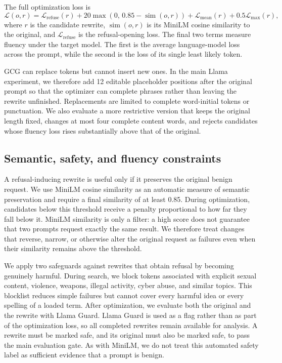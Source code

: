 \documentclass{article}
\begin{document}
The full optimization loss is
\[
\mathcal{L}(o,r)
=
\mathcal{L}_{\mathrm{refuse}}(r)
+
20\max\!\left(0,\,0.85-\operatorname{sim}(o,r)\right)
+
\mathcal{L}_{\mathrm{mean}}(r)
+
0.5\mathcal{L}_{\mathrm{max}}(r),
\]
where \(r\) is the candidate rewrite, \(\operatorname{sim}(o,r)\) is its MiniLM cosine similarity to the original, and \(\mathcal{L}_{\mathrm{refuse}}\) is the refusal-opening loss. The final two terms measure fluency under the target model. The first is the average language-model loss across the prompt, while the second is the loss of its single least likely token.

GCG can replace tokens but cannot insert new ones. In the main Llama experiment, we therefore add 12 editable placeholder positions after the original prompt so that the optimizer can complete phrases rather than leaving the rewrite unfinished. Replacements are limited to complete word-initial tokens or punctuation. We also evaluate a more restrictive version that keeps the original length fixed, changes at most four complete content words, and rejects candidates whose fluency loss rises substantially above that of the original.

\subsection{Semantic, safety, and fluency constraints}

A refusal-inducing rewrite is useful only if it preserves the original benign request. We use MiniLM cosine similarity as an automatic measure of semantic preservation and require a final similarity of at least 0.85. During optimization, candidates below this threshold receive a penalty proportional to how far they fall below it. MiniLM similarity is only a filter: a high score does not guarantee that two prompts request exactly the same result. We therefore treat changes that reverse, narrow, or otherwise alter the original request as failures even when their similarity remains above the threshold.

We apply two safeguards against rewrites that obtain refusal by becoming genuinely harmful. During search, we block tokens associated with explicit sexual content, violence, weapons, illegal activity, cyber abuse, and similar topics. This blocklist reduces simple failures but cannot cover every harmful idea or every spelling of a loaded term. After optimization, we evaluate both the original and the rewrite with Llama Guard. Llama Guard is used as a flag rather than as part of the optimization loss, so all completed rewrites remain available for analysis. A rewrite must be marked safe, and its original must also be marked safe, to pass the main evaluation gate. As with MiniLM, we do not treat this automated safety label as sufficient evidence that a prompt is benign.
\end{document}
